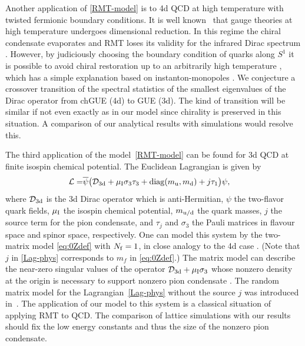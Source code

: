 \documentclass[aps,prl,reprint,graphicx,showpacs]{revtex4-1}
\begin{document}
Another application of \eqref{RMT-model} is to 4d QCD at high temperature with twisted fermionic boundary conditions. It is well known~\cite{Ginsparg:1980ef,Nadkarni:1982kb} that gauge theories at high temperature undergoes dimensional reduction. In this regime the chiral condensate evaporates and RMT loses its validity for the infrared Dirac spectrum \cite{Kovacs:2009zj}. However, by judiciously choosing the boundary condition of quarks along $S^1$ it is possible to avoid chiral restoration up to an arbitrarily high temperature \cite{Stephanov:1996he,Bilgici:2009tx}, which has a simple explanation based on instanton-monopoles \cite{Shuryak:2012aa}. We conjecture a crossover transition of the spectral statistics of the smallest eigenvalues of the Dirac operator from chGUE (4d) to GUE (3d). {  The kind of transition will be similar if not even exactly as in our model since chirality is preserved in this situation. A comparison of our analytical results with simulations would resolve this.}

The third application of the model~\eqref{RMT-model} can be found for 3d QCD at finite isospin chemical potential. The Euclidean Lagrangian is given by
\begin{equation}\label{Lag-phys}
\begin{split}
	 \mathcal{L} = & \overline{\psi}\bigl(\mathcal{D}_{\rm 3d}
	 + \mu_{\rm I} \sigma_3\tau_3+{\rm diag}(m_{\rm u},m_{\rm d})+j\tau_1\bigl)\psi,
\end{split}
\end{equation}
where $\mathcal{D}_{\rm 3d}$ is the 3d Dirac operator which is anti-Hermitian, $\psi$ the two-flavor quark fields, $\mu_{\rm I}$ the isospin chemical potential, $m_{\rm u/d}$ the quark masses, $j$ the source term for the pion condensate, and $\tau_j$ and $\sigma_3$ the Pauli matrices in flavour space and spinor space, respectively. One can model this system by the two-matrix model \eqref{eq:0Zdef} with $N_{\rm f}=1$, in close analogy to the 4d case \cite{Osborn:2004}. (Note that $j$ in \eqref{Lag-phys} corresponds to $m_f$ in \eqref{eq:0Zdef}.) The matrix model can describe the near-zero singular values of the operator 
${\mathcal D}_{\rm 3d}+\mu_{\rm I}\sigma_3$ whose nonzero density at the origin is necessary to support nonzero pion condensate \cite{Kanazawa:2011tt}. The random matrix model for the Lagrangian~\eqref{Lag-phys} without the source $j$ was introduced in~\cite{Akemann:2001bf}. {  The application of our model to this system is a classical situation of applying RMT to QCD. The comparison of lattice simulations with our results should fix the low energy constants and thus the size of the nonzero pion condensate.}
\end{document}
